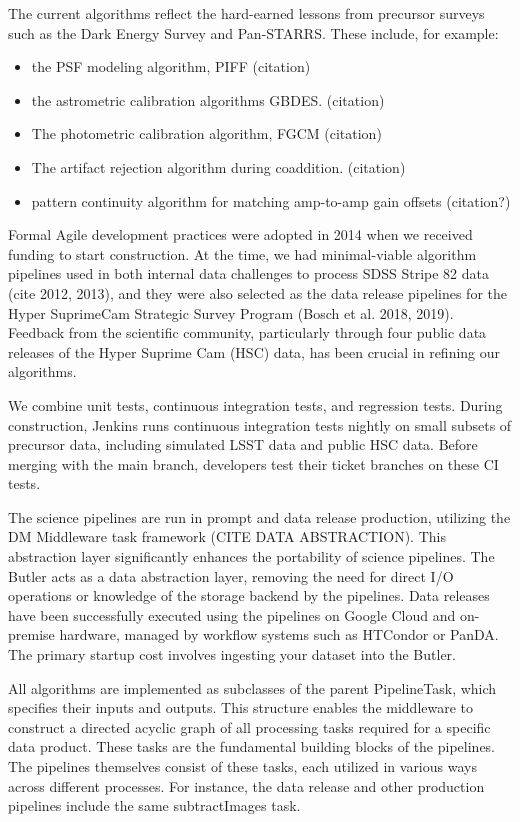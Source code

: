 The current algorithms reflect the hard-earned lessons from precursor surveys such as the Dark Energy Survey and Pan-STARRS.
These include, for example:
\begin{itemize}
\item the PSF modeling algorithm, PIFF (citation)
\item the astrometric calibration algorithms GBDES. (citation)
\item The photometric calibration algorithm, FGCM (citation)
\item The artifact rejection algorithm during coaddition. (citation)
\item pattern continuity algorithm for matching amp-to-amp gain offsets (citation?)
\end{itemize}

Formal Agile development practices were adopted in 2014 when we received funding to start construction. At the time, we had minimal-viable algorithm pipelines used in both internal data challenges to process SDSS Stripe 82 data (cite 2012, 2013), and they were also selected as the data release pipelines for the Hyper SuprimeCam Strategic Survey Program  (Bosch et al. 2018, 2019). Feedback from the scientific community, particularly through four public data releases of the Hyper Suprime Cam (HSC) data, has been crucial in refining our algorithms.

We combine unit tests, continuous integration tests, and regression tests. During construction, Jenkins runs continuous integration tests nightly on small subsets of precursor data, including simulated  LSST data and public HSC data. Before merging with the main branch, developers test their ticket branches on these CI tests.

The science pipelines are run in prompt and data release production, utilizing the DM Middleware task framework (CITE DATA ABSTRACTION). This abstraction layer significantly enhances the portability of science pipelines. The Butler acts as a data abstraction layer, removing the need for direct I/O operations or knowledge of the storage backend by the pipelines. Data releases have been successfully executed using the pipelines on Google Cloud and on-premise hardware, managed by workflow systems such as HTCondor or PanDA. The primary startup cost involves ingesting your dataset into the Butler.

All algorithms are implemented as subclasses of the parent PipelineTask, which specifies their inputs and outputs. This structure enables the middleware to construct a directed acyclic graph of all processing tasks required for a specific data product. These tasks are the fundamental building blocks of the pipelines. The pipelines themselves consist of these tasks, each utilized in various ways across different processes. For instance, the data release and other production pipelines include the same subtractImages task.

